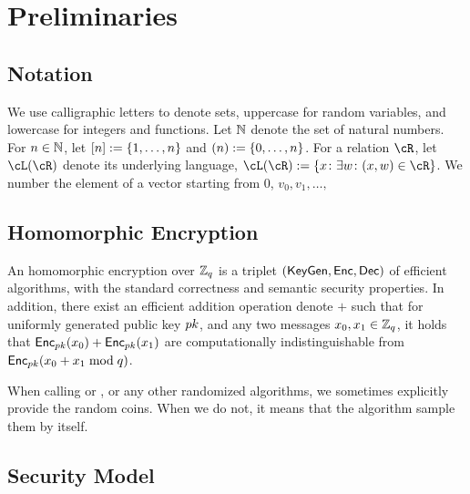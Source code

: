 \section{Preliminaries}\label{sec:Preliminaries}

\subsection{Notation} 
We use calligraphic letters to denote sets, uppercase for random variables, and lowercase for integers and functions. %
Let ${\mathbb{N}}$ denote the set of natural numbers.  For $n\in {\mathbb{N}}$, let $[n] \eqdef \set{1,\ldots,n}$ and $(n) \eqdef \set{0,\ldots,n}$.  For a relation $\cR$, let $\cL(\cR)$ denote its underlying language, \ie  $\cL(\cR) \eqdef \set{x\colon \exists w \colon (x,w) \in \cR}$.    We number the element of a vector starting from $0$, \ie $v_0,v_1,
\ldots,$


\subsection{Homomorphic Encryption}
An homomorphic encryption over ${\mathbb Z}_q$ is a triplet $(\mathsf{KeyGen},\mathsf{Enc},\mathsf{Dec})$ of efficient algorithms, with the standard correctness and semantic security properties.  In addition, there exist an efficient  addition operation denote $+$  such that for uniformly  generated public key  ${pk}$, and any two  messages $x_0,x_1\in {\mathbb Z}_q$,  it holds that  $\mathsf{Enc}_{pk}(x_0) + \mathsf{Enc}_{pk}(x_1) $ are computationally indistinguishable from $\mathsf{Enc}_{pk}(x_0+ x_1 \bmod q)$.


\begin{remark}
When calling  \KeyGen or \Enc, or any other randomized algorithms,  we sometimes explicitly provide the random coins. When we do not, it means that the algorithm sample them by itself. 
\end{remark}


\subsection{Security Model}



